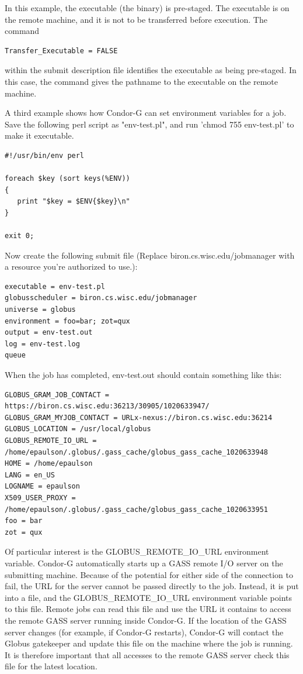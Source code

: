 In this example, the executable (the binary) is pre-staged.
The executable is on the remote machine, and it is not to
be transferred before execution.
The command
\begin{verbatim}
Transfer_Executable = FALSE
\end{verbatim}
within the submit description file identifies the executable
as being pre-staged.
In this case, the 
command gives the pathname to the executable on the remote machine.

A third example shows how
Condor-G can set environment variables for a job.
Save the following perl script as "env-test.pl",
and run 'chmod 755 env-test.pl'
to make it executable.

\begin{verbatim}
#!/usr/bin/env perl

foreach $key (sort keys(%ENV))
{
   print "$key = $ENV{$key}\n"
}

exit 0;
\end{verbatim}

Now create the following submit file
(Replace biron.cs.wisc.edu/jobmanager with a resource
you're authorized to use.):

\begin{verbatim}
executable = env-test.pl
globusscheduler = biron.cs.wisc.edu/jobmanager
universe = globus
environment = foo=bar; zot=qux
output = env-test.out
log = env-test.log
queue
\end{verbatim}

When the job has completed, env-test.out should contain something like this:

\begin{verbatim}
GLOBUS_GRAM_JOB_CONTACT = https://biron.cs.wisc.edu:36213/30905/1020633947/
GLOBUS_GRAM_MYJOB_CONTACT = URLx-nexus://biron.cs.wisc.edu:36214
GLOBUS_LOCATION = /usr/local/globus
GLOBUS_REMOTE_IO_URL = /home/epaulson/.globus/.gass_cache/globus_gass_cache_1020633948
HOME = /home/epaulson
LANG = en_US
LOGNAME = epaulson
X509_USER_PROXY = /home/epaulson/.globus/.gass_cache/globus_gass_cache_1020633951
foo = bar
zot = qux
\end{verbatim}


Of particular interest is the GLOBUS\_REMOTE\_IO\_URL environment variable.
Condor-G automatically starts up a GASS remote I/O
server on the submitting machine.
Because of the potential for either side of the connection to fail,
the URL for the server cannot be passed directly to the job.
Instead, it is put into a file, and the GLOBUS\_REMOTE\_IO\_URL
environment variable points to this file. 
Remote jobs can read this file and use the URL it contains
to access the remote GASS server running inside Condor-G.
If the location
of the GASS server changes (for example, if Condor-G restarts),
Condor-G will contact the Globus gatekeeper and update this file on
the machine where the job is running.
It is therefore important that all accesses to
the remote GASS server check this file for the latest location.

